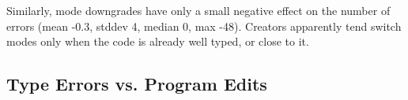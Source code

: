 \documentclass[english,submission,cleveref]{programming}
\begin{document}
Similarly, mode downgrades have only a small negative effect on the
number of errors (mean -0.3, stddev 4, median 0, max -48).
Creators apparently tend switch modes only when the code is already
well typed, or close to it.




\subsection{Type Errors vs. Program Edits}
\label{s:type-error-survival}
\end{document}
